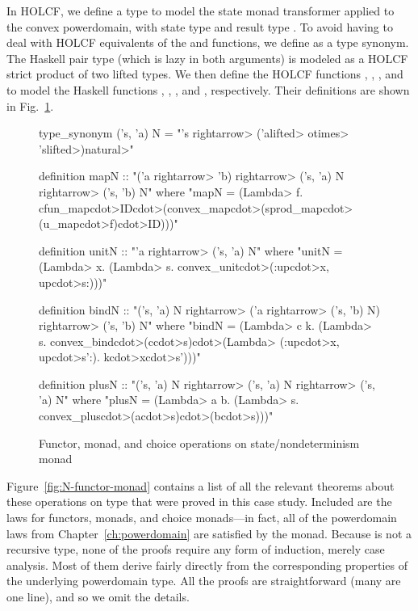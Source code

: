 In HOLCF, we define a type  to model the state monad transformer applied to the convex powerdomain, with state type  and result type . To avoid having to deal with HOLCF equivalents of the  and  functions, we define  as a type synonym. The Haskell pair type  (which is lazy in both arguments) is modeled as a HOLCF strict product of two lifted types. We then define the HOLCF functions , , , and  to model the Haskell functions , , \hs{(>{}>=)}, and \hs{(|+|)}, respectively. Their definitions are shown in Fig.~\ref{fig:N-operations}.

\begin{figure}
\begin{isacode}
type_synonym ('s, 'a) N = "'s \<rightarrow> ('a\<lifted> \<otimes> 's\<lifted>)\<natural>"
\end{isacode}
\unmedskip
{}
\begin{isacode}
definition mapN :: "('a \<rightarrow> 'b) \<rightarrow> ('s, 'a) N \<rightarrow> ('s, 'b) N"
  where "mapN = (\<Lambda> f. cfun_map\<cdot>ID\<cdot>(convex_map\<cdot>(sprod_map\<cdot>(u_map\<cdot>f)\<cdot>ID)))"
\end{isacode}
\unmedskip
{}
\begin{isacode}
definition unitN :: "'a \<rightarrow> ('s, 'a) N"
  where "unitN = (\<Lambda> x. (\<Lambda> s. convex_unit\<cdot>(:up\<cdot>x, up\<cdot>s:)))"
\end{isacode}
\unmedskip
{}
\begin{isacode}
definition bindN :: "('s, 'a) N \<rightarrow> ('a \<rightarrow> ('s, 'b) N) \<rightarrow> ('s, 'b) N"
  where "bindN = (\<Lambda> c k. (\<Lambda> s. convex_bind\<cdot>(c\<cdot>s)\<cdot>(\<Lambda> (:up\<cdot>x, up\<cdot>s':). k\<cdot>x\<cdot>s')))"
\end{isacode}
\unmedskip
{}
\begin{isacode}
definition plusN :: "('s, 'a) N \<rightarrow> ('s, 'a) N \<rightarrow> ('s, 'a) N"
  where "plusN = (\<Lambda> a b. (\<Lambda> s. convex_plus\<cdot>(a\<cdot>s)\<cdot>(b\<cdot>s)))"
\end{isacode}
\caption{Functor, monad, and choice operations on state/nondeterminism monad}
\label{fig:N-operations}
\end{figure}

Figure~\ref{fig:N-functor-monad} contains a list of all the relevant theorems about these operations on type  that were proved in this case study. Included are the laws for functors, monads, and choice monads---in fact, all of the powerdomain laws from Chapter~\ref{ch:powerdomain} are satisfied by the  monad. Because  is not a recursive type, none of the proofs require any form of induction, merely case analysis. Most of them derive fairly directly from the corresponding properties of the underlying powerdomain type. All the proofs are straightforward (many are one line), and so we omit the details.

